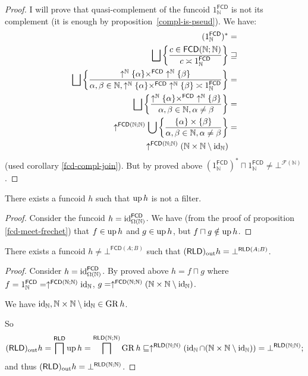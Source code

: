 \begin{proof}
I will prove that quasi-complement of the funcoid $1_{\mathbb{N}}^{\mathsf{FCD}}$
is not its complement (it is enough by proposition~\ref{compl-is-pseud}). We have:
\begin{align*}
(1_{\mathbb{N}}^{\mathsf{FCD}})^{\ast} & =\\
\bigsqcup\left\{ \frac{c\in\mathsf{FCD}(\mathbb{N};\mathbb{N})}{c\asymp1_{\mathbb{N}}^{\mathsf{FCD}}}\right\} & \sqsupseteq\\
\bigsqcup\left\{ \frac{\uparrow^{\mathbb{N}}\{\alpha\}\times^{\mathsf{FCD}}\uparrow^{\mathbb{N}}\{\beta\}}{\alpha,\beta\in\mathbb{N},\uparrow^{\mathbb{N}}\{\alpha\}\times^{\mathsf{FCD}}\uparrow^{\mathbb{N}}\{\beta\}\asymp1_{\mathbb{N}}^{\mathsf{FCD}}}\right\} & =\\
\bigsqcup\left\{ \frac{\uparrow^{\mathbb{N}}\{\alpha\}\times^{\mathsf{FCD}}\uparrow^{\mathbb{N}}\{\beta\}}{\alpha,\beta\in\mathbb{N},\alpha\ne\beta}\right\} & =\\
\uparrow^{\mathsf{FCD}(\mathbb{N};\mathbb{N})}\bigcup\left\{ \frac{\{\alpha\}\times\{\beta\}}{\alpha,\beta\in\mathbb{N},\alpha\ne\beta}\right\} & =\\
\uparrow^{\mathsf{FCD}(\mathbb{N};\mathbb{N})}(\mathbb{N}\times\mathbb{N}\setminus\operatorname{id}_{\mathbb{N}})
\end{align*}
(used corollary \ref{fcd-compl-join}). But by proved above $(1_{\mathbb{N}}^{\mathsf{FCD}})^{\ast}\sqcap1_{\mathbb{N}}^{\mathsf{FCD}}\ne\bot^{\mathscr{F}(\mathbb{N})}$.\end{proof}
\begin{example}
There exists a funcoid $h$ such that $\operatorname{up} h$ is not a filter.\end{example}
\begin{proof}
Consider the funcoid $h=\operatorname{id}_{\Omega(\mathbb{N})}^{\mathsf{FCD}}$.
We have (from the proof of proposition \ref{fcd-meet-frechet}) that
$f\in\operatorname{up} h$ and $g\in\operatorname{up} h$, but $f\sqcap g\notin\operatorname{up} h$.\end{proof}
\begin{example}
There exists a funcoid $h\ne\bot^{\mathsf{FCD}(A;B)}$ such that $(\mathsf{RLD})_{\mathrm{out}} h=\bot^{\mathsf{RLD}(A;B)}$.\end{example}
\begin{proof}
Consider $h=\operatorname{id}_{\Omega(\mathbb{N})}^{\mathsf{FCD}}$. By proved above
$h=f\sqcap g$ where $f=1_{\mathbb{N}}^{\mathsf{FCD}}=\uparrow^{\mathsf{FCD}(\mathbb{N};\mathbb{N})}\operatorname{id}_{\mathbb{N}}$,
$g=\uparrow^{\mathsf{FCD}(\mathbb{N};\mathbb{N})}(\mathbb{N}\times\mathbb{N}\setminus\operatorname{id}_{\mathbb{N}})$.

We have $\operatorname{id}_{\mathbb{N}},\mathbb{N}\times\mathbb{N}\setminus\operatorname{id}_{\mathbb{N}}\in\operatorname{GR} h$.

So
\[
(\mathsf{RLD})_{\mathrm{out}} h=\bigsqcap^{\mathsf{RLD}}\operatorname{up} h=\bigsqcap^{\mathsf{RLD}(\mathbb{N};\mathbb{N})}\operatorname{GR} h\sqsubseteq\uparrow^{\mathsf{RLD}(\mathbb{N};\mathbb{N})}(\operatorname{id}_{\mathbb{N}}\cap(\mathbb{N}\times\mathbb{N}\setminus\operatorname{id}_{\mathbb{N}}))=\bot^{\mathsf{RLD}(\mathbb{N};\mathbb{N})};
\]
and thus $(\mathsf{RLD})_{\mathrm{out}} h=\bot^{\mathsf{RLD}(\mathbb{N};\mathbb{N})}$.\end{proof}
